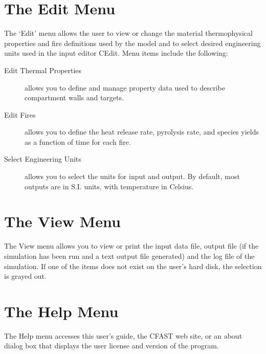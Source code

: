 \section{The Edit Menu}


The `Edit' menu allows the user to view or change the material thermophysical properties and fire definitions used by the model and to select desired engineering units used in the input editor CEdit. Menu items include the following:
\begin{description}
\item[Edit Thermal Properties] allows you to define and manage property data used to describe compartment walls and targets.
\item[Edit Fires] allows you to define the heat release rate, pyrolysis rate, and species yields as a function of time for each fire.
\item[Select Engineering Units] allows you to select the units for input and output. By default, most outputs are in S.I. units, with temperature in Celsius.
\end{description}

\section{The View Menu}

The View menu allows you to view or print the input data file, output file (if the simulation has been run and a text output file generated) and the log file of the simulation. If one of the items does not exist on the user's hard disk, the selection is grayed out.

\section{The Help Menu}

The Help menu accesses this user's guide, the CFAST web site, or an about dialog box that displays the user license and version of the program.







